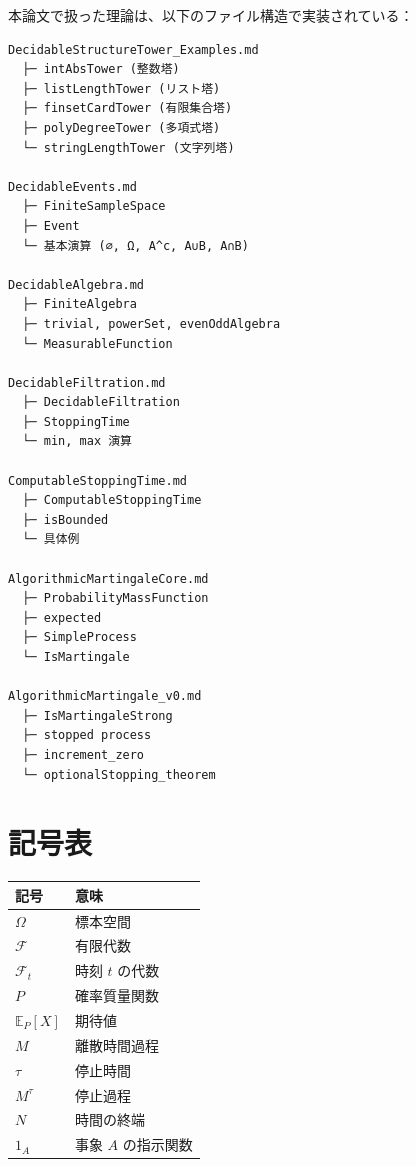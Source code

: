 \documentclass[a4paper,12pt]{ltjsarticle}
\theoremstyle{definition}
\begin{document}
本論文で扱った理論は、以下のファイル構造で実装されている：

\begin{verbatim}
DecidableStructureTower_Examples.md
  ├─ intAbsTower (整数塔)
  ├─ listLengthTower (リスト塔)
  ├─ finsetCardTower (有限集合塔)
  ├─ polyDegreeTower (多項式塔)
  └─ stringLengthTower (文字列塔)

DecidableEvents.md
  ├─ FiniteSampleSpace
  ├─ Event
  └─ 基本演算 (∅, Ω, A^c, A∪B, A∩B)

DecidableAlgebra.md
  ├─ FiniteAlgebra
  ├─ trivial, powerSet, evenOddAlgebra
  └─ MeasurableFunction

DecidableFiltration.md
  ├─ DecidableFiltration
  ├─ StoppingTime
  └─ min, max 演算

ComputableStoppingTime.md
  ├─ ComputableStoppingTime
  ├─ isBounded
  └─ 具体例

AlgorithmicMartingaleCore.md
  ├─ ProbabilityMassFunction
  ├─ expected
  ├─ SimpleProcess
  └─ IsMartingale

AlgorithmicMartingale_v0.md
  ├─ IsMartingaleStrong
  ├─ stopped process
  ├─ increment_zero
  └─ optionalStopping_theorem
\end{verbatim}

\section{記号表}

\begin{tabular}{ll}
\hline
記号 & 意味 \\
\hline
$\Omega$ & 標本空間 \\
$\mathcal{F}$ & 有限代数 \\
$\mathcal{F}_t$ & 時刻 $t$ の代数 \\
$P$ & 確率質量関数 \\
$\mathbb{E}_P[X]$ & 期待値 \\
$M$ & 離散時間過程 \\
$\tau$ & 停止時間 \\
$M^\tau$ & 停止過程 \\
$N$ & 時間の終端 \\
$1_A$ & 事象 $A$ の指示関数 \\
\hline
\end{tabular}
\end{document}
